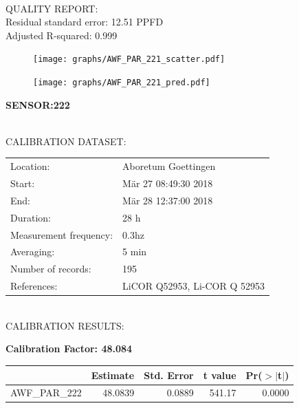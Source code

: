 \documentclass[oneside]{report}
\begin{document}
\hrulefill\\
QUALITY REPORT:\\
Residual standard error: 12.51 PPFD\\
Adjusted R-squared: 0.999



\begin{figure}[H]
  \centering
  \texttt{[image: graphs/AWF\_PAR\_221\_scatter.pdf]}
\end{figure}




\begin{figure}[H]
  \centering
  \texttt{[image: graphs/AWF\_PAR\_221\_pred.pdf]}
\end{figure}

\pagebreak


\begin{center}
\large{\textbf{SENSOR:222}}\\
\end{center}

\hrulefill\\
CALIBRATION DATASET:\\
\begin{table}[h!]
  \centering
  \label{tab:table1}
  \begin{tabular}{ll}
    Location: & Aboretum Goettingen\\ 
    
    
    Start:  & Mär 27 08:49:30 2018 \\
    End:   & Mär 28 12:37:00 2018\\ 
    Duration: & 28 h\\
    Measurement frequency: & 0.3hz\\
    Averaging:  &5 min\\
    Number of records: & 195 \\
    References: & LiCOR Q52953, Li-COR Q 52953 \\
  \end{tabular}
\end{table}

\hrulefill\\
CALIBRATION RESULTS:\\


\begin{center}
\textbf{\large{Calibration Factor: 48.084}}\\
\end{center}
\begin{table}[ht]
\centering
\begin{tabular}{rrrrr}
  \hline
 & Estimate & Std. Error & t value & Pr($>$$|$t$|$) \\ 
  \hline
AWF\_PAR\_222 & 48.0839 & 0.0889 & 541.17 & 0.0000 \\ 
   \hline
\end{tabular}
\end{table}
\end{document}
